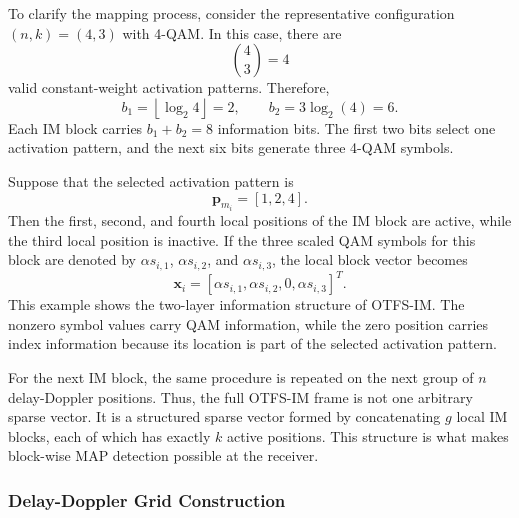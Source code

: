 To clarify the mapping process, consider the representative configuration \((n,k)=(4,3)\) with 4-QAM. In this case, there are
\begin{equation}
    \binom{4}{3}=4
\end{equation}
valid constant-weight activation patterns. Therefore,
\begin{equation}
    b_1=\left\lfloor \log_2 4 \right\rfloor=2,
    \qquad
    b_2=3\log_2(4)=6.
\end{equation}
Each IM block carries \(b_1+b_2=8\) information bits. The first two bits select one activation pattern, and the next six bits generate three 4-QAM symbols.

Suppose that the selected activation pattern is
\begin{equation}
    \mathbf{p}_{m_i}=[1,2,4].
\end{equation}
Then the first, second, and fourth local positions of the IM block are active, while the third local position is inactive. If the three scaled QAM symbols for this block are denoted by \(\alpha s_{i,1}\), \(\alpha s_{i,2}\), and \(\alpha s_{i,3}\), the local block vector becomes
\begin{equation}
    \mathbf{x}_{i}
    =
    \left[
    \alpha s_{i,1},
    \alpha s_{i,2},
    0,
    \alpha s_{i,3}
    \right]^{T}.
    \label{eq:otfs_im_local_block_example}
\end{equation}
This example shows the two-layer information structure of OTFS-IM. The nonzero symbol values carry QAM information, while the zero position carries index information because its location is part of the selected activation pattern.

For the next IM block, the same procedure is repeated on the next group of \(n\) delay-Doppler positions. Thus, the full OTFS-IM frame is not one arbitrary sparse vector. It is a structured sparse vector formed by concatenating \(g\) local IM blocks, each of which has exactly \(k\) active positions. This structure is what makes block-wise MAP detection possible at the receiver.

\subsubsection{Delay-Doppler Grid Construction}

